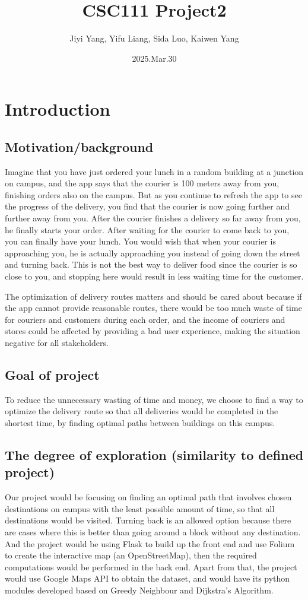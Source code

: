 \documentclass[12pt]{article}
\title{CSC111 Project2}
\author{Jiyi Yang, Yifu Liang, Sida Luo, Kaiwen Yang}
\date{2025.Mar.30}
\begin{document}
	
	\maketitle
	
	\section*{Introduction}
	\subsection*{Motivation/background}
	Imagine that you have just ordered your lunch in a random building at a junction on campus, and the app says that the courier is 100 meters away from you, finishing orders also on the campus. But as you continue to refresh the app to see the progress of the delivery, you find that the courier is now going further and further away from you. After the courier finishes a delivery so far away from you, he finally starts your order. After waiting for the courier to come back to you, you can finally have your lunch. You would wish that when your courier is approaching you, he is actually approaching you instead of going down the street and turning back. This is not the best way to deliver food since the courier is so close to you, and stopping here would result in less waiting time for the customer.
	
	The optimization of delivery routes matters and should be cared about because if the app cannot provide reasonable routes, there would be too much waste of time for couriers and customers during each order, and the income of couriers and stores could be affected by providing a bad user experience, making the situation negative for all stakeholders.
	
	\subsection*{Goal of project}
	To reduce the unnecessary wasting of time and money, we choose to find a way to optimize the delivery route so that all deliveries would be completed in the shortest time, by finding optimal paths between buildings on this campus.
	
	\subsection*{The degree of exploration (similarity to defined project)}
	Our project would be focusing on finding an optimal path that involves chosen destinations on campus with the least possible amount of time, so that all destinations would be visited. Turning back is an allowed option because there are cases where this is better than going around a block without any destination. And the project would be using Flask\cite{noauthor_welcome_nodate} to build up the front end and use Folium to create the interactive map (an OpenStreetMap), then the required computations would be performed in the back end. Apart from that, the project would use Google Maps API\cite{noauthor_googlemapsgoogle-maps-services-python_2025} \cite{noauthor_distance_nodate} to obtain the dataset, and would have its python modules developed based on Greedy Neighbour and Dijkstra’s Algorithm.
	
\end{document}
